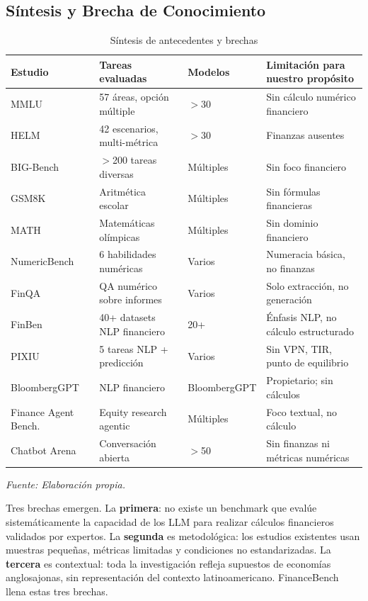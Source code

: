 \documentclass[12pt,a4paper]{article}
\begin{document}
\subsection{Síntesis y Brecha de Conocimiento}

\begin{table}[H]
\centering
\caption{Síntesis de antecedentes y brechas}
\label{tab:antecedentes}
\begin{tabularx}{\textwidth}{lXXX}
\toprule
\textbf{Estudio} & \textbf{Tareas evaluadas} & \textbf{Modelos} & \textbf{Limitación para nuestro propósito} \\
\midrule
MMLU \citep{Hendrycks2021} & 57 áreas, opción múltiple & $>$30 & Sin cálculo numérico financiero \\
HELM \citep{Liang2023} & 42 escenarios, multi-métrica & $>$30 & Finanzas ausentes \\
BIG-Bench \citep{Srivastava2022} & $>$200 tareas diversas & Múltiples & Sin foco financiero \\
GSM8K \citep{Cobbe2021} & Aritmética escolar & Múltiples & Sin fórmulas financieras \\
MATH \citep{Hendrycks2021b} & Matemáticas olímpicas & Múltiples & Sin dominio financiero \\
NumericBench \citep{Li2024} & 6 habilidades numéricas & Varios & Numeracia básica, no finanzas \\
FinQA \citep{Chen2021} & QA numérico sobre informes & Varios & Solo extracción, no generación \\
FinBen \citep{Xie2024} & 40+ datasets NLP financiero & 20+ & Énfasis NLP, no cálculo estructurado \\
PIXIU \citep{Xie2023} & 5 tareas NLP + predicción & Varios & Sin VPN, TIR, punto de equilibrio \\
BloombergGPT \citep{Wu2023} & NLP financiero & BloombergGPT & Propietario; sin cálculos \\
Finance Agent Bench.\ \citep{Bigeard2025} & Equity research agentic & Múltiples & Foco textual, no cálculo \\
Chatbot Arena \citep{Wang2024} & Conversación abierta & $>$50 & Sin finanzas ni métricas numéricas \\
\bottomrule
\end{tabularx}
\smallskip
\footnotesize\textit{Fuente: Elaboración propia.}
\end{table}

Tres brechas emergen. La \textbf{primera}: no existe un benchmark que evalúe sistemáticamente la capacidad de los LLM para realizar cálculos financieros validados por expertos. La \textbf{segunda} es metodológica: los estudios existentes usan muestras pequeñas, métricas limitadas y condiciones no estandarizadas. La \textbf{tercera} es contextual: toda la investigación refleja supuestos de economías anglosajonas, sin representación del contexto latinoamericano. FinanceBench llena estas tres brechas.
\end{document}
